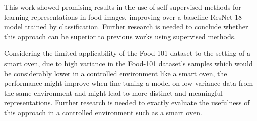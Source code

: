 This work showed promising results in the use of self-supervised methods for learning representations in food images, 
improving over a baseline ResNet-18 model trained by classification. Further research is needed to conclude whether this
approach can be superior to previous works using supervised methods. 

Considering the limited applicability of the Food-101 dataset to the setting of a smart oven, due to high variance 
in the Food-101 dataset's samples which would be considerably lower in a controlled environment like a smart oven, 
the performance might improve when fine-tuning a model on low-variance data from the same environment and might 
lead to more distinct and meaningful representations. Further research is needed to exactly evaluate the usefulness
of this approach in a controlled environment such as a smart oven.
